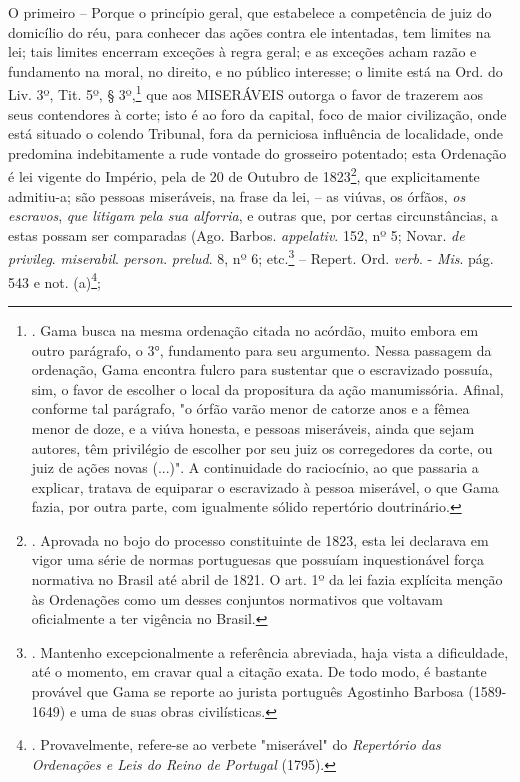 O primeiro -- Porque o princípio geral, que estabelece a competência de
juiz do domicílio do réu, para conhecer das ações contra ele intentadas,
tem limites na lei; tais limites encerram exceções à regra geral; e as
exceções acham razão e fundamento na moral, no direito, e no público
interesse; o limite está na Ord. do Liv. 3º, Tit. 5º, § 3º,\footnote{.
  Gama busca na mesma ordenação citada no acórdão, muito embora em outro
  parágrafo, o 3°, fundamento para seu argumento. Nessa passagem da
  ordenação, Gama encontra fulcro para sustentar que o escravizado
  possuía, sim, o favor de escolher o local da propositura da ação
  manumissória. Afinal, conforme tal parágrafo, "o órfão varão menor de
  catorze anos e a fêmea menor de doze, e a viúva honesta, e pessoas
  miseráveis, ainda que sejam autores, têm privilégio de escolher por
  seu juiz os corregedores da corte, ou juiz de ações novas (...)". A
  continuidade do raciocínio, ao que passaria a explicar, tratava de
  equiparar o escravizado à pessoa miserável, o que Gama fazia, por
  outra parte, com igualmente sólido repertório doutrinário.} que aos
MISERÁVEIS outorga o favor de trazerem aos seus contendores à corte;
isto é ao foro da capital, foco de maior civilização, onde está situado
o colendo Tribunal, fora da perniciosa influência de localidade, onde
predomina indebitamente a rude vontade do grosseiro potentado; esta
Ordenação é lei vigente do Império, pela de 20 de Outubro de
1823\footnote{. Aprovada no bojo do processo constituinte de 1823, esta
  lei declarava em vigor uma série de normas portuguesas que possuíam
  inquestionável força normativa no Brasil até abril de 1821. O art. 1º
  da lei fazia explícita menção às Ordenações como um desses conjuntos
  normativos que voltavam oficialmente a ter vigência no Brasil.}, que
explicitamente admitiu-a; são pessoas miseráveis, na frase da lei, -- as
viúvas, os órfãos, \emph{os escravos}, \emph{que litigam pela sua
alforria}, e outras que, por certas circunstâncias, a estas possam ser
comparadas (Ago. Barbos. \emph{appelativ}. 152, nº 5; Novar. \emph{de
privileg}. \emph{miserabil}. \emph{person}. \emph{prelud}. 8, nº 6;
etc.\footnote{. Mantenho excepcionalmente a referência abreviada, haja
  vista a dificuldade, até o momento, em cravar qual a citação exata. De
  todo modo, é bastante provável que Gama se reporte ao jurista
  português Agostinho Barbosa (1589-1649) e uma de suas obras
  civilísticas.} -- Repert. Ord. \emph{verb}. - \emph{Mis}. pág. 543 e
not. (a)\footnote{. Provavelmente, refere-se ao verbete "miserável" do
  \emph{Repertório das Ordenações e Leis do Reino de Portugal} (1795).};
